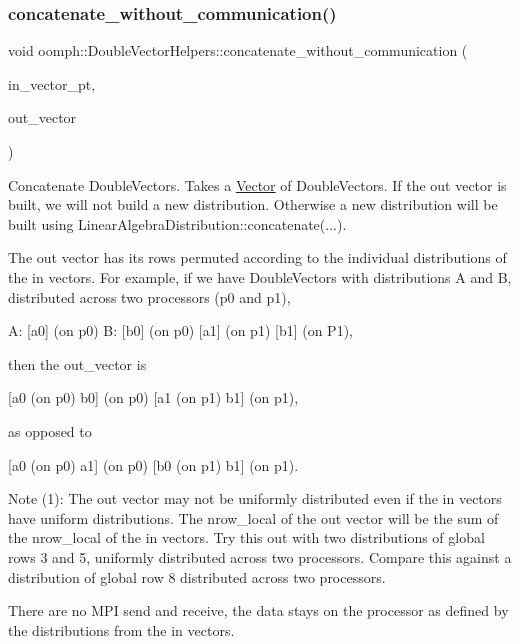 \subsubsection{\texorpdfstring{concatenate\+\_\+without\+\_\+communication()}{concatenate\_without\_communication()}\hspace{0.1cm}{\footnotesize\ttfamily [1/2]}}
{\footnotesize\ttfamily void oomph\+::\+Double\+Vector\+Helpers\+::concatenate\+\_\+without\+\_\+communication (\begin{DoxyParamCaption}\item[{const \hyperlink{classoomph_1_1Vector}{Vector}$<$ \hyperlink{classoomph_1_1DoubleVector}{Double\+Vector} $\ast$$>$ \&}]{in\+\_\+vector\+\_\+pt,  }\item[{\hyperlink{classoomph_1_1DoubleVector}{Double\+Vector} \&}]{out\+\_\+vector }\end{DoxyParamCaption})}



Concatenate Double\+Vectors. Takes a \hyperlink{classoomph_1_1Vector}{Vector} of Double\+Vectors. If the out vector is built, we will not build a new distribution. Otherwise a new distribution will be built using Linear\+Algebra\+Distribution\+::concatenate(...). 

The out vector has its rows permuted according to the individual distributions of the in vectors. For example, if we have Double\+Vectors with distributions A and B, distributed across two processors (p0 and p1),

A\+: \mbox{[}a0\mbox{]} (on p0) B\+: \mbox{[}b0\mbox{]} (on p0) \mbox{[}a1\mbox{]} (on p1) \mbox{[}b1\mbox{]} (on P1),

then the out\+\_\+vector is

\mbox{[}a0 (on p0) b0\mbox{]} (on p0) \mbox{[}a1 (on p1) b1\mbox{]} (on p1),

as opposed to

\mbox{[}a0 (on p0) a1\mbox{]} (on p0) \mbox{[}b0 (on p1) b1\mbox{]} (on p1).

Note (1)\+: The out vector may not be uniformly distributed even if the in vectors have uniform distributions. The nrow\+\_\+local of the out vector will be the sum of the nrow\+\_\+local of the in vectors. Try this out with two distributions of global rows 3 and 5, uniformly distributed across two processors. Compare this against a distribution of global row 8 distributed across two processors.

There are no M\+PI send and receive, the data stays on the processor as defined by the distributions from the in vectors.

